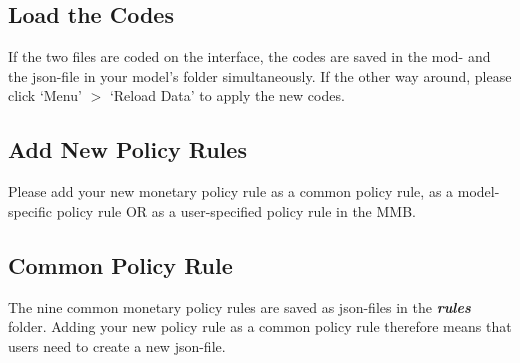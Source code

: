 \documentclass[10pt,a4paper]{article}
\begin{document}
\subsection{Load the Codes}
\bigskip

If the two files are coded on the interface, the codes are saved in the mod- and the json-file in your model's folder simultaneously. If the other way around, please click ‘Menu' $>$ ‘Reload Data' to apply the new codes.
\pagebreak








\begin{flushleft}
\section{Add New Policy Rules}
\end{flushleft}
\medskip

Please add your new monetary policy rule as a common policy rule, as a model-specific policy rule OR as a user-specified policy rule in the MMB.
\bigskip
\bigskip

\subsection{Common Policy Rule}
\bigskip

The nine common monetary policy rules are saved as json-files in the \textbf{\textit{rules}} folder. Adding your new policy rule as a common policy rule therefore means that users need to create a new json-file. 
\end{document}
